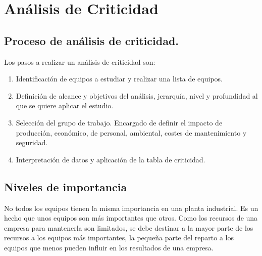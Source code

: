 \section{Análisis de Criticidad}
\subsection{Proceso de análisis de criticidad.}
Los pasos a realizar un análisis de criticidad son:
\begin{enumerate}
    \item Identificación de equipos a estudiar y realizar una lista de equipos.
\item Definición de alcance y objetivos del análisis,
jerarquía, nivel y profundidad al que se quiere
aplicar el estudio.
\item Selección del grupo de trabajo. Encargado de
definir el impacto de producción, económico, de
personal, ambiental, costes de mantenimiento y
seguridad.
\item Interpretación de datos y aplicación de la tabla de criticidad. 
\end{enumerate}


\subsection{Niveles de importancia}
No todos los equipos tienen la misma importancia en una planta industrial. Es un hecho que unos equipos son más importantes que otros. Como los recursos de una empresa para mantenerla son limitados, se debe destinar a la mayor parte de los recursos a los equipos más importantes, la pequeña parte del reparto a los equipos que menos pueden influir en los resultados de una empresa.

